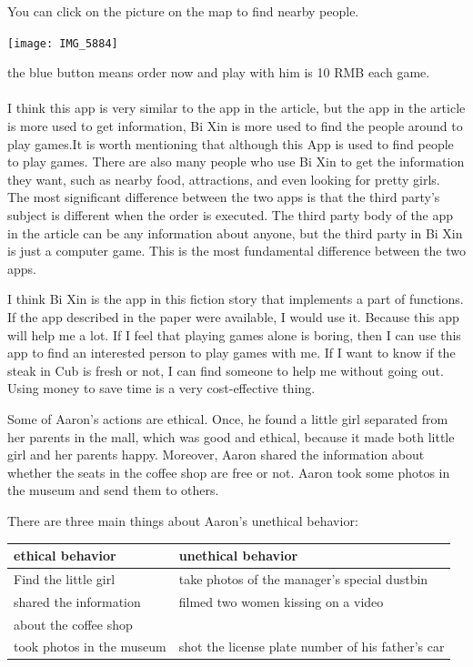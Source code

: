 \documentclass{article}
\begin{document}
You can click on the picture on the map to find nearby people.
\newpage

\begin{center}
  \texttt{[image: IMG\_5884]}
  
\end{center}
the blue button means order now and play with him is 10 RMB each game.
\\
\\

I think this app is very similar to the app in the article, but the app in the article is more used to get information,
 Bi Xin is more used to find the people around to play games.It is worth mentioning that although this App is used to find people to play games. 
There are also many people who use Bi Xin to get the information they want, such as nearby food, attractions, and even looking for pretty girls.
The most significant difference between the two apps is that the third party's subject is different when the order is executed.
The third party body of the app in the article can be any information about anyone, but the third party in Bi Xin is just a computer game.
This is the most fundamental difference between the two apps.

I think Bi Xin is the app in this fiction story that implements a part of functions.
If the app described in the paper were available, I would use it.
Because this app will help me a lot.
If I feel that playing games alone is boring,
then I can use this app to find an interested person to play games with me.
If I want to know if the steak in Cub is fresh or not,
I can find someone to help me without going out.
Using money to save time is a very cost-effective thing.


Some of Aaron's actions are ethical.
 Once, he found a little girl separated from her parents in the mall, 
 which was good and ethical,
  because it made both little girl and her parents happy. Moreover, 
  Aaron shared the information about whether the seats in the coffee shop are free or not. 
  Aaron took some photos in the museum and send them to others.


There are three main things about Aaron's unethical behavior: 



\begin{center}
  \begin{tabular}{ |l|l|}
    \hline
    ethical behavior & unethical behavior  \\ \hline
    Find the little girl & take photos of the manager's special dustbin  \\ \hline
    shared the information & filmed two women kissing on a video\\
    about the coffee shop &   \\ \hline
    took photos in the museum & shot the license plate number of his father's car \\
    \hline
  \end{tabular}
\end{center}
\end{document}

